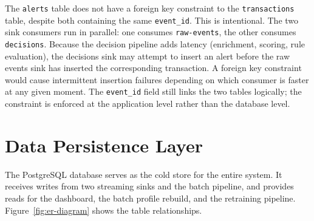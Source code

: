 The \texttt{alerts} table does not have a foreign key constraint to the
\texttt{transactions} table, despite both containing the same
\texttt{event\_id}. This is intentional. The two sink consumers run in
parallel: one consumes \texttt{raw-events}, the other consumes
\texttt{decisions}. Because the decision pipeline adds latency (enrichment,
scoring, rule evaluation), the decisions sink may attempt to insert an alert
before the raw events sink has inserted the corresponding transaction. A
foreign key constraint would cause intermittent insertion failures depending
on which consumer is faster at any given moment. The \texttt{event\_id} field
still links the two tables logically; the constraint is enforced at the
application level rather than the database level.


\section{Data Persistence Layer}
\label{sec:persistence}

The PostgreSQL database serves as the cold store for the entire system. It
receives writes from two streaming sinks and the batch pipeline, and provides
reads for the dashboard, the batch profile rebuild, and the retraining
pipeline. Figure~\ref{fig:er-diagram} shows the table relationships.

